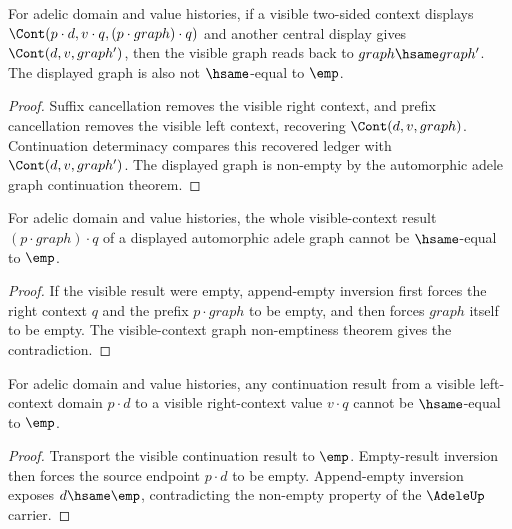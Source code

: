 \begin{theorem}
\label{thm:automorphic-adele-graph-visible-context-displayed-graph-readback}
For adelic domain and value histories, if a visible two-sided context displays
$\Cont(p \cdot d, v \cdot q, (p \cdot graph) \cdot q)$ and another central
display gives $\Cont(d,v,graph')$, then the visible graph reads back to
$graph\hsame graph'$. The displayed graph is also not $\hsame$-equal to
$\emp$.
\end{theorem}
\begin{proof}
Suffix cancellation removes the visible right context, and prefix cancellation
removes the visible left context, recovering $\Cont(d,v,graph)$. Continuation
determinacy compares this recovered ledger with $\Cont(d,v,graph')$. The
displayed graph is non-empty by the automorphic adele graph continuation
theorem.
\end{proof}

\begin{theorem}
\label{thm:automorphic-adele-graph-visible-context-result-nonempty}
For adelic domain and value histories, the whole visible-context result
\((p \cdot graph) \cdot q\) of a displayed automorphic adele graph cannot be
\(\hsame\)-equal to \(\emp\).
\end{theorem}
\begin{proof}
If the visible result were empty, append-empty inversion first forces the
right context \(q\) and the prefix \(p \cdot graph\) to be empty, and then
forces \(graph\) itself to be empty. The visible-context graph
non-emptiness theorem gives the contradiction.
\end{proof}

\begin{theorem}
\label{thm:automorphic-adele-graph-visible-result-nonempty}
For adelic domain and value histories, any continuation result from a visible
left-context domain $p \cdot d$ to a visible right-context value $v \cdot q$
cannot be $\hsame$-equal to $\emp$.
\end{theorem}
\begin{proof}
Transport the visible continuation result to $\emp$. Empty-result inversion
then forces the source endpoint $p \cdot d$ to be empty. Append-empty inversion
exposes $d\hsame\emp$, contradicting the non-empty property of the $\AdeleUp$
carrier.
\end{proof}

